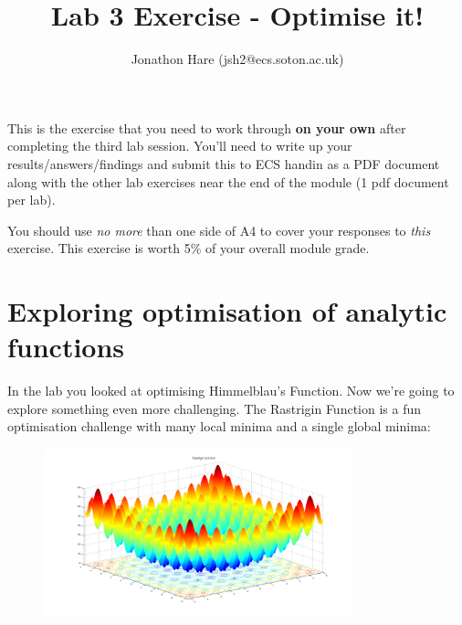 \documentclass[a4paper]{article}
\begin{document}
\lstset{language=Python,upquote=true}

\setlength{\leftskip}{20pt}
\title{Lab 3 Exercise - Optimise it!}
\author{Jonathon Hare (jsh2@ecs.soton.ac.uk)}

\maketitle


This is the exercise that you need to work through \textbf{on your own} after completing the third lab session. You'll need to write up your results/answers/findings and submit this to ECS handin as a PDF document along with the other lab exercises near the end of the module (1 pdf document per lab). 

You should use \emph{no more} than one side of A4 to cover your responses to \emph{this} exercise. This exercise is worth 5\% of your overall module grade.

\section{Exploring optimisation of analytic functions}\label{analytic}
In the lab you looked at optimising Himmelblau's Function. Now we're going to explore something even more challenging. The Rastrigin Function is a fun optimisation challenge with many local minima and a single global minima:

\begin{figure}[h!]
	\center
	\includegraphics[width=0.8\textwidth]{Rastrigin_function.png}
\end{figure}
\end{document}
